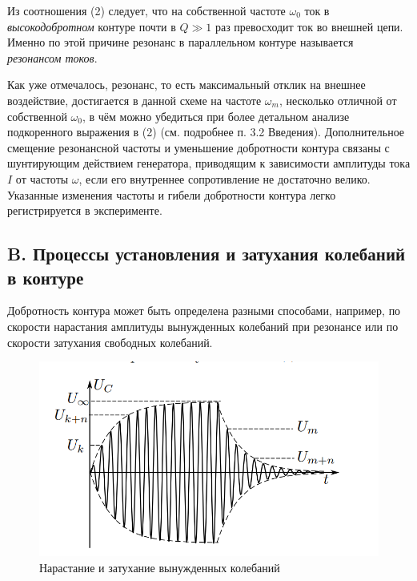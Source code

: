 \documentclass[12pt,a4paper]{article}
\begin{document}
Из соотношения (2) следует, что на собственной частоте \(\omega_0\) ток в \textit{высокодобротном} контуре почти в \(Q \gg 1\) раз превосходит ток во внешней цепи. Именно по этой причине резонанс в параллельном контуре называется \textit{резонансом токов}.

Как уже отмечалось, резонанс, то есть максимальный отклик на внешнее воздействие, достигается в данной схеме на частоте \(\omega_m\), несколько отличной от собственной \(\omega_0\), в чём можно убедиться при более детальном анализе подкоренного выражения в (2) (см. подробнее п. 3.2 Введения). Дополнительное смещение резонансной частоты и уменьшение добротности контура связаны с шунтирующим действием генератора, приводящим к зависимости амплитуды тока \(I\) от частоты \(\omega\), если его внутреннее сопротивление не достаточно велико. Указанные изменения частоты и гибели добротности контура легко регистрируется в эксперименте.

\subsection*{B. Процессы установления и затухания колебаний в контуре}

Добротность контура может быть определена разными способами, например, по скорости нарастания амплитуды вынужденных колебаний при резонансе или по скорости затухания свободных колебаний.

\begin{figure}[h!]
    \centering
    \includegraphics[scale=0.9]{increase.png} %
    \caption{Нарастание и затухание вынужденных колебаний}
\end{figure}
\end{document}
